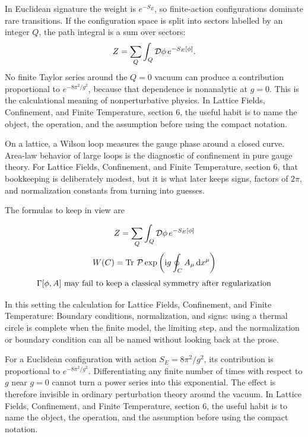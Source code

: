 In Euclidean signature the weight is \(e^{-S_E}\), so finite-action configurations dominate rare transitions.  If the configuration space is split into sectors labelled by an integer \(Q\), the path integral is a sum over sectors:
\[
  Z=\sum_Q\int_Q\mathcal D\phi\,e^{-S_E[\phi]}.
\]
No finite Taylor series around the \(Q=0\) vacuum can produce a contribution proportional to \(e^{-8\pi^2/g^2}\), because that dependence is nonanalytic at \(g=0\).  This is the calculational meaning of nonperturbative physics.  In Lattice Fields, Confinement, and Finite Temperature, section 6, the useful habit is to name the object, the operation, and the assumption before using the compact notation.

On a lattice, a Wilson loop measures the gauge phase around a closed curve.  Area-law behavior of large loops is the diagnostic of confinement in pure gauge theory.  For Lattice Fields, Confinement, and Finite Temperature, section 6, that bookkeeping is deliberately modest, but it is what later keeps signs, factors of \(2\pi\), and normalization constants from turning into guesses.

The formulas to keep in view are

\[
  Z=\sum_Q\int_Q\mathcal D\phi\,e^{-S_E[\phi]}
\]
\[
  W(C)=\operatorname{Tr}\,\mathcal P\exp\left(\mathrm i g\oint_C A_\mu\,\mathrm d x^\mu\right)
\]
\[
  \Gamma[\phi,A]\hbox{ may fail to keep a classical symmetry after regularization}
\]

In this setting the calculation for Lattice Fields, Confinement, and Finite Temperature: Boundary conditions, normalization, and signs: using a thermal circle is complete when the finite model, the limiting step, and the normalization or boundary condition can all be named without looking back at the prose.




\begin{example}
For a Euclidean configuration with action \(S_E=8\pi^2/g^2\), its contribution is proportional to \(e^{-8\pi^2/g^2}\).  Differentiating any finite number of times with respect to \(g\) near \(g=0\) cannot turn a power series into this exponential.  The effect is therefore invisible in ordinary perturbation theory around the vacuum.  In Lattice Fields, Confinement, and Finite Temperature, section 6, the useful habit is to name the object, the operation, and the assumption before using the compact notation.
\end{example}



